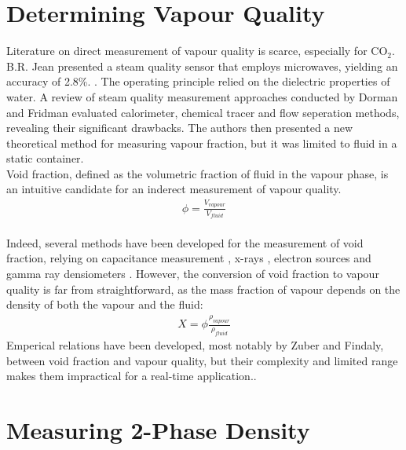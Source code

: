 \documentclass{report}
\begin{document}
\section{Determining Vapour Quality}
Literature on direct measurement of vapour quality is scarce, especially for CO$_2$. B.R. Jean presented a steam quality sensor that employs microwaves, yielding an accuracy of 2.8\%. \cite{Jean 2007}. The operating principle relied on the dielectric properties of water. A review of steam quality measurement approaches conducted by Dorman and Fridman \cite{Dorfman 2006} evaluated calorimeter, chemical tracer and flow seperation methods, revealing their significant drawbacks. The authors then presented a new theoretical method for measuring vapour fraction, but it was limited to fluid in a static container. \\
Void fraction, defined as the volumetric fraction of fluid in the vapour phase, is an intuitive candidate for an inderect measurement of vapour quality. 
\begin{eqnarray}
\phi =\frac{V_{vapour}}{V_{fluid}}
\end{eqnarray}\\
Indeed, several methods have been developed for the measurement of void fraction, relying on capacitance measurement \cite{Beker 2005}, x-rays \cite{Bauer 2012}, electron sources \cite{Augyrond 2001} and gamma ray densiometers \cite{Zhao 2013}. However, the conversion of void fraction to vapour quality is far from straightforward, as the mass fraction of vapour depends on the density of both the vapour and the fluid:
\begin{eqnarray}
X =\phi\frac{\rho_{vapour}}{\rho_{fluid}}
\end{eqnarray}
Emperical relations have been developed, most notably by Zuber and Findaly, between void fraction and vapour quality, but their complexity and limited range makes them impractical for a real-time application.\cite{lecture}.

\section{Measuring 2-Phase Density}
\end{document}
